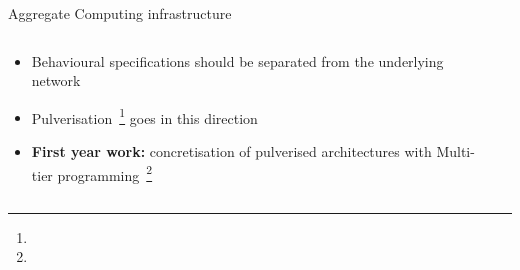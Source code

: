 \begin{frame}{Aggregate Computing infrastructure}
  \begin{columns}
    \begin{column}{0.5\textwidth}
      \begin{card}[Deployment]
        \begin{itemize}
          \item Behavioural specifications should be separated from the underlying network
          \item Pulverisation~\footnote[frame]{} goes in this direction
          \item \textbf{First year work:} concretisation of pulverised architectures with Multi-tier programming~\footnote[frame]{}
        \end{itemize}
      \end{card}
    
    \end{column}

    \begin{column}{0.3\textwidth}
    \end{column}
  \end{columns}
  
  
\end{frame}